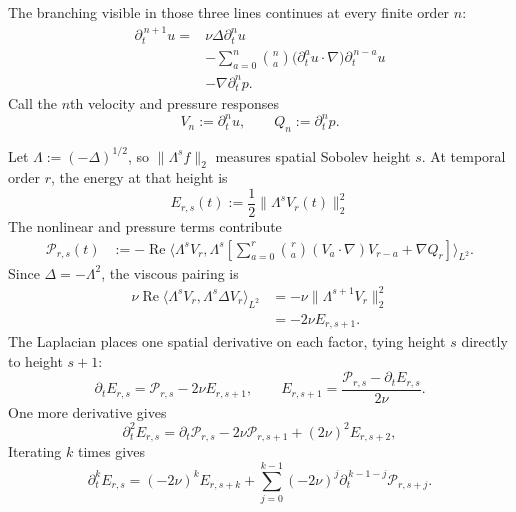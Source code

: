 \documentclass[11pt]{article}
\begin{document}
The branching visible in those three lines continues at every finite order
\(n\):
\[
\begin{aligned}
  \partial_t^{\,n+1}u
  ={}&\nu\Delta\partial_t^nu
  \\
  &-\sum_{a=0}^{n}\binom{n}{a}
    \bigl(\partial_t^au\cdot\nabla\bigr)
    \partial_t^{\,n-a}u
  \\
  &-\nabla\partial_t^np.
\end{aligned}
\]
Call the \(n\)th velocity and pressure responses
\[
  V_n:=\partial_t^nu,
  \qquad
  Q_n:=\partial_t^np.
\]

Let \(\Lambda:=(-\Delta)^{1/2}\), so \(\|\Lambda^sf\|_2\) measures spatial
Sobolev height \(s\). At temporal order \(r\), the energy at that height is
\[
  E_{r,s}(t):=\frac12\|\Lambda^sV_r(t)\|_2^2
\]
The nonlinear and pressure terms contribute
\[
\begin{aligned}
  \mathcal P_{r,s}(t)
  &:=-\operatorname{Re}
  \Biggl\langle
    \Lambda^sV_r,
    \Lambda^s\!\left[
      \sum_{a=0}^{r}\binom{r}{a}
      (V_a\cdot\nabla)V_{r-a}
      +\nabla Q_r
    \right]
  \Biggr\rangle_{L^2}.
\end{aligned}
\]
Since \(\Delta=-\Lambda^2\), the viscous pairing is
\[
\begin{aligned}
  \nu\operatorname{Re}
  \langle\Lambda^sV_r,\Lambda^s\Delta V_r\rangle_{L^2}
  &=-\nu\|\Lambda^{s+1}V_r\|_2^2
  \\
  &=-2\nu E_{r,s+1}.
\end{aligned}
\]
The Laplacian places one spatial derivative on each factor, tying height \(s\)
directly to height \(s+1\):
\[
  \partial_tE_{r,s}
  =\mathcal P_{r,s}-2\nu E_{r,s+1},
  \qquad
  E_{r,s+1}
  =\frac{\mathcal P_{r,s}-\partial_tE_{r,s}}{2\nu}.
\]
One more derivative gives
\[
  \partial_t^2E_{r,s}
  =\partial_t\mathcal P_{r,s}
  -2\nu\mathcal P_{r,s+1}
  +(2\nu)^2E_{r,s+2},
\]
Iterating \(k\) times gives
\[
  \partial_t^kE_{r,s}
  =(-2\nu)^kE_{r,s+k}
  +\sum_{j=0}^{k-1}
    (-2\nu)^j
    \partial_t^{\,k-1-j}\mathcal P_{r,s+j}.
\]
\end{document}

